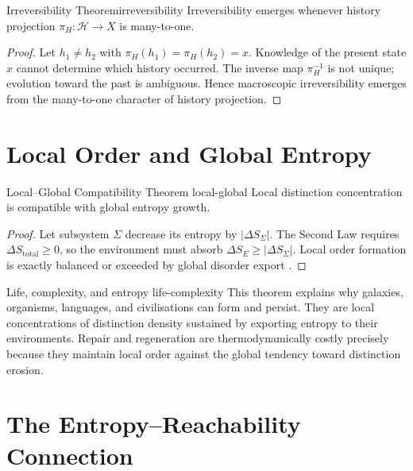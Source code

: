 \documentclass[12pt,twoside,openright]{book}
\newcommand{\hist}{\mathcal{H}}
\begin{document}
\begin{theorem}{Irreversibility Theorem}{irreversibility}
  Irreversibility emerges whenever history projection
  $\pi_H: \hist \to X$ is many-to-one.
\end{theorem}

\begin{proof}
  Let $h_1 \ne h_2$ with $\pi_H(h_1) = \pi_H(h_2) = x$.
  Knowledge of the present state $x$ cannot determine
  which history occurred. The inverse map $\pi_H^{-1}$
  is not unique; evolution toward the past is ambiguous.
  Hence macroscopic irreversibility emerges from the
  many-to-one character of history projection.
\end{proof}

\section{Local Order and Global Entropy}
\label{sec:ch3-local}

\begin{theorem}{Local--Global Compatibility Theorem}%
  {local-global}
  Local distinction concentration is compatible with
  global entropy growth.
\end{theorem}

\begin{proof}
  Let subsystem $\Sigma$ decrease its entropy by
  $|\Delta S_\Sigma|$. The Second Law requires
  $\Delta S_\mathrm{total} \ge 0$, so the environment
  must absorb $\Delta S_E \ge |\Delta S_\Sigma|$.
  Local order formation is exactly balanced or exceeded
  by global disorder export \parencite{schrodinger1944}.
\end{proof}

\begin{remark}{Life, complexity, and entropy}%
  {life-complexity}
  This theorem explains why galaxies, organisms,
  languages, and civilisations can form and persist.
  They are local concentrations of distinction density
  sustained by exporting entropy to their environments.
  Repair and regeneration are thermodynamically costly
  precisely because they maintain local order against
  the global tendency toward distinction erosion.
\end{remark}

\section{The Entropy--Reachability Connection}
\label{sec:ch3-reach}
\end{document}
